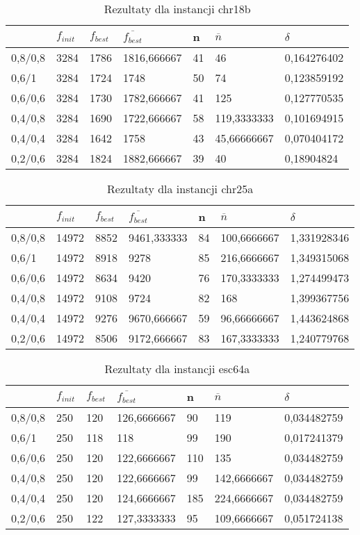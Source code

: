 \begin{table}[H]
\label{T3_chr18b}
\begin{tabular}{l l l l l l l}
\hline
 & $f_{init}$ & $f_{best}$ & $\overline{f_{best}}$ & n & $\overline{n}$ & $\delta$ \\
\hline
0,8/0,8 & 3284 & 1786 & 1816,666667 & 41 & 46 & 0,164276402\\
0,6/1 & 3284 & 1724 & 1748 & 50 & 74 & 0,123859192\\
0,6/0,6 & 3284 & 1730 & 1782,666667 & 41 & 125 & 0,127770535\\
0,4/0,8 & 3284 & 1690 & 1722,666667 & 58 & 119,3333333 & 0,101694915\\
0,4/0,4 & 3284 & 1642 & 1758 & 43 & 45,66666667 & 0,070404172\\
0,2/0,6 & 3284 & 1824 & 1882,666667 & 39 & 40 & 0,18904824\\
\hline
\end{tabular}
\caption{Rezultaty dla instancji chr18b}
\end{table}

\begin{table}[H]
\label{T3_chr25a}
\begin{tabular}{l l l l l l l}
\hline
 & $f_{init}$ & $f_{best}$ & $\overline{f_{best}}$ & n & $\overline{n}$ & $\delta$ \\
\hline
0,8/0,8 & 14972 & 8852 & 9461,333333 & 84 & 100,6666667 & 1,331928346\\
0,6/1 & 14972 & 8918 & 9278 & 85 & 216,6666667 & 1,349315068\\
0,6/0,6 & 14972 & 8634 & 9420 & 76 & 170,3333333 & 1,274499473\\
0,4/0,8 & 14972 & 9108 & 9724 & 82 & 168 & 1,399367756\\
0,4/0,4 & 14972 & 9276 & 9670,666667 & 59 & 96,66666667 & 1,443624868\\
0,2/0,6 & 14972 & 8506 & 9172,666667 & 83 & 167,3333333 & 1,240779768\\
\hline
\end{tabular}
\caption{Rezultaty dla instancji chr25a}
\end{table}

\begin{table}[H]
\label{T3_esc64a}
\begin{tabular}{l l l l l l l}
\hline
 & $f_{init}$ & $f_{best}$ & $\overline{f_{best}}$ & n & $\overline{n}$ & $\delta$ \\
\hline
0,8/0,8 & 250 & 120 & 126,6666667 & 90 & 119 & 0,034482759\\
0,6/1 & 250 & 118 & 118 & 99 & 190 & 0,017241379\\
0,6/0,6 & 250 & 120 & 122,6666667 & 110 & 135 & 0,034482759\\
0,4/0,8 & 250 & 120 & 122,6666667 & 99 & 142,6666667 & 0,034482759\\
0,4/0,4 & 250 & 120 & 124,6666667 & 185 & 224,6666667 & 0,034482759\\
0,2/0,6 & 250 & 122 & 127,3333333 & 95 & 109,6666667 & 0,051724138\\
\hline
\end{tabular}
\caption{Rezultaty dla instancji esc64a}
\end{table}


